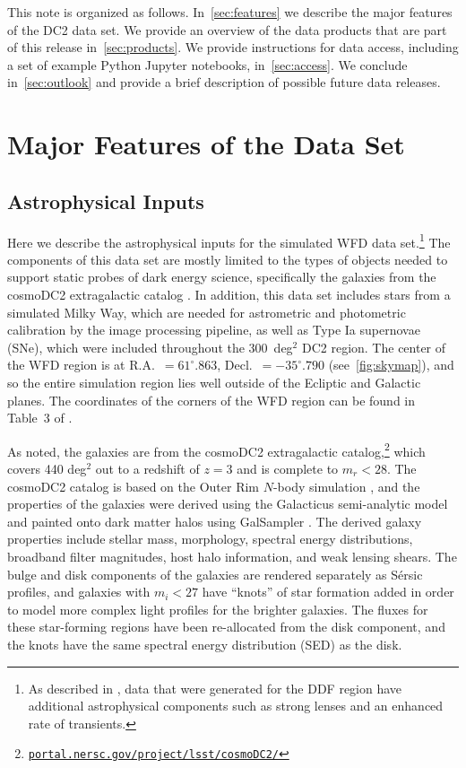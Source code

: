 \documentclass[modern]{descnote}
\newcommand*{\https}[1]{\href{https://#1}{\nolinkurl{#1}}}
\begin{document}
This note is organized as follows. In~\autoref{sec:features} we describe the major features of the DC2 data set. We provide an overview of the data products that are part of this release in~\autoref{sec:products}. We provide instructions for data access, including a set of example Python Jupyter notebooks, in~\autoref{sec:access}. We conclude in~\autoref{sec:outlook} and provide a brief description of possible future data releases. 

\section{Major Features of the Data Set}
\label{sec:features}

\subsection{Astrophysical Inputs}

Here we describe the astrophysical inputs for the simulated WFD data set.\footnote{As described in \cite{2020arXiv201005926L}, data that were generated for the DDF region have additional astrophysical components such as strong lenses and an enhanced rate of transients.}  The components of this data set are mostly limited to the types of objects needed to support static probes of dark energy science, specifically the galaxies from the cosmoDC2 extragalactic catalog \citep{korytov}.  In addition, this data set includes stars from a simulated Milky Way, which are needed for astrometric and photometric calibration by the image processing pipeline, as well as Type Ia supernovae (SNe), which were included throughout the 300~deg$^2$ DC2 region.  The center of the WFD region is at R.A.~$= 61^\circ\!\!.863$, Decl.~$= -35^\circ\!\!.790$ (see~\autoref{fig:skymap}), and so the entire simulation region lies well outside of the Ecliptic and Galactic planes.
The coordinates of the corners of the WFD region can be found in Table~3 of \citet{2020arXiv201005926L}.

As noted, the galaxies are from the cosmoDC2 extragalactic catalog,\footnote{ \https{portal.nersc.gov/project/lsst/cosmoDC2/}} which covers 440 deg$^2$ out to a redshift of $z = 3$ and is complete to $m_r <28$.  The cosmoDC2 catalog is based on the Outer Rim $N$-body simulation \citep{2019ApJS..245...16H}, and the properties of the galaxies were derived using the Galacticus semi-analytic model \citep{benson_2010b} and painted onto dark matter halos using GalSampler \citep{2020MNRAS.495.5040H}.  The derived galaxy properties include stellar mass, morphology, spectral energy distributions, broadband filter magnitudes, host halo information, and weak lensing shears.   The bulge and disk components of the galaxies are rendered separately as S\'ersic profiles, and galaxies with $m_i < 27$ have ``knots'' of star formation added in order to model more complex light profiles for the brighter galaxies. The fluxes for these star-forming regions have been re-allocated from the disk component, and the knots have the same spectral energy distribution (SED) as the disk.
\end{document}
